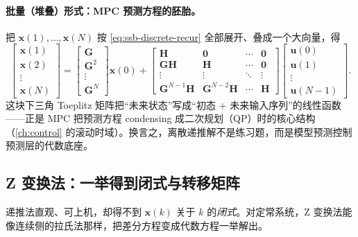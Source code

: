 \paragraph{批量（堆叠）形式：MPC 预测方程的胚胎。}
把 $\mathbf{x}(1),\dots,\mathbf{x}(N)$ 按 \cref{eq:ssb-discrete-recur} 全部展开、叠成一个大向量，得
\begin{equation}
  \begin{bmatrix}\mathbf{x}(1)\\\mathbf{x}(2)\\\vdots\\\mathbf{x}(N)\end{bmatrix}
  =\begin{bmatrix}\mathbf{G}\\\mathbf{G}^2\\\vdots\\\mathbf{G}^N\end{bmatrix}\mathbf{x}(0)
  +\begin{bmatrix}\mathbf{H}&\mathbf{0}&\cdots&\mathbf{0}\\\mathbf{G}\mathbf{H}&\mathbf{H}&\cdots&\mathbf{0}\\\vdots&\vdots&\ddots&\vdots\\\mathbf{G}^{N-1}\mathbf{H}&\mathbf{G}^{N-2}\mathbf{H}&\cdots&\mathbf{H}\end{bmatrix}
  \begin{bmatrix}\mathbf{u}(0)\\\mathbf{u}(1)\\\vdots\\\mathbf{u}(N-1)\end{bmatrix}.
  \label{eq:ssb-discrete-batch}
\end{equation}
这块下三角 Toeplitz 矩阵把“未来状态”写成“初态 $+$ 未来输入序列”的线性函数——正是 MPC 把预测方程 condensing 成二次规划（QP）时的核心结构（\cref{ch:control} 的滚动时域）。换言之，离散递推解不是练习题，而是模型预测控制预测层的代数底座。

\subsection{Z 变换法：一举得到闭式与转移矩阵}
\label{sec:ssb-discrete-ztrans}

递推法直观、可上机，却得不到 $\mathbf{x}(k)$ 关于 $k$ 的\emph{闭式}。对定常系统，Z 变换法能像连续侧的拉氏法那样，把差分方程变成代数方程一举解出。

